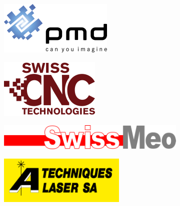 \begin{figure}[h!]
    \begin{subfigure}[h]{0.15\textheight}
        \includegraphics[width=\textwidth]{images/sponsors/pmd}
    \end{subfigure}%
    \hspace{1cm}
    \begin{subfigure}[h]{0.15\textheight}
        \includegraphics[width=\textwidth]{images/sponsors/SwissCNCTechnologies}
    \end{subfigure}
\vspace{0.4cm}


    \begin{subfigure}[h]{0.15\textheight}
        \includegraphics[width=\textwidth]{images/sponsors/SwissMeo}
    \end{subfigure}%
    \hspace{1cm}
    \begin{subfigure}[h]{0.15\textheight}
        \includegraphics[width=\textwidth]{images/sponsors/techniquesLaser}
    \end{subfigure}
\vspace{0.4cm}


\end{figure}
